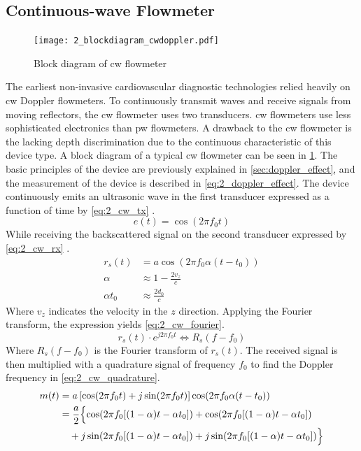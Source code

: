 \subsection{Continuous-wave Flowmeter}
\begin{figure}[htbp]
	\centering
	\texttt{[image: 2\_blockdiagram\_cwdoppler.pdf]}
	\caption[Block diagram of continuous-wave flowmeter]{Block diagram of \gls{cw} flowmeter \cite{JensenUltrasoundBook}}
	\label{fig:2_devices_cw}
\end{figure}
The earliest non-invasive cardiovascular diagnostic technologies relied heavily on \gls{cw} Doppler flowmeters. To continuously transmit waves and receive signals from moving reflectors, the \gls{cw} flowmeter uses two transducers. \gls{cw} flowmeters use less sophisticated electronics than \gls{pw} flowmeters. A drawback to the \gls{cw} flowmeter is the lacking depth discrimination due to the continuous characteristic of this device type. A block diagram of a typical \gls{cw} flowmeter can be seen in \cref{fig:2_devices_cw}. The basic principles of the device are previously explained in \cref{sec:doppler_effect}, and the measurement of the device is described in \cref{eq:2_doppler_effect}. The device continuously emits an ultrasonic wave in the first transducer expressed as a function of time by \cref{eq:2_cw_tx} \cite{JensenUltrasoundBook}.
\begin{equation} \label{eq:2_cw_tx}
	e(t) = \cos (2\pi f_{0} t)
\end{equation}
While receiving the backscattered signal on the second transducer expressed by \cref{eq:2_cw_rx} \cite{JensenUltrasoundBook}.
\begin{align} \label{eq:2_cw_rx}
	r_{s}(t) &= a \cos \left( 2\pi f_{0} \alpha (t-t_{0}) \right) \\
	\alpha &\approx 1 - \frac{2 v_{z}}{c} \\
	\alpha t_{0} &\approx \frac{2 d_{0}}{c}
\end{align}
Where $v_{z}$ indicates the velocity in the $z$ direction. Applying the Fourier transform, the expression yields \cref{eq:2_cw_fourier}.
\begin{equation} \label{eq:2_cw_fourier}
	r_{s}(t)\cdot e^{j2\pi f_{0} t} \Longleftrightarrow R_{s}(f-f_{0})
\end{equation}
Where $R_{s}(f-f_{0})$ is the Fourier transform of $r_{s}(t)$. The received signal is then multiplied with a quadrature signal of frequency $f_{0}$ to find the Doppler frequency in \cref{eq:2_cw_quadrature}.
\begin{align} \label{eq:2_cw_quadrature}
	m(t) &= a \left[ \cos(2\pi f_{0} t) + j\sin (2\pi f_{0} t) \right] \cos (2\pi f_{0} \alpha (t-t_{0})) \\
	&= \frac{a}{2} \Bigl\{ \cos (2\pi f_{0} [ (1-\alpha) t- \alpha t_{0} ]) + \cos (2\pi f_{0} [ (1-\alpha) t- \alpha t_{0} ]) \\
	&\quad + j \sin (2\pi f_{0} [ (1-\alpha) t- \alpha t_{0} ]) + j \sin (2\pi f_{0} [(1-\alpha) t- \alpha t_{0} ]) \Bigr\} \nonumber
\end{align}

